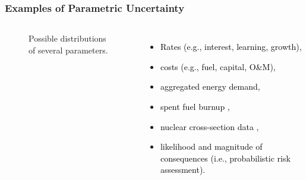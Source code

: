 \begin{frame}
    \frametitle{Examples of Parametric Uncertainty}

    \begin{columns}
        \column[t]{5cm}
        \begin{figure}
            \centering
            \resizebox{\columnwidth}{!}{
                
            }
            \caption{Possible distributions of several parameters.}
            \label{fig:multi-distributions}
        \end{figure}

        \column[t]{5cm}

        \begin{itemize}
            \item \textcolor{black}{Rates (e.g., interest, learning, growth),}
            \item \textcolor{black}{costs (e.g., fuel, capital, O\&M),}
            \item \textcolor{black}{aggregated energy demand,}
            \item \textcolor{black}{spent fuel burnup
            \cite{feng_sensitivity_2020},}
            \item \textcolor{black}{nuclear cross-section data
            \cite{eades_influence_2016,radaideh_combining_2019},}
            \item \textcolor{black}{likelihood and magnitude of consequences
            (i.e., probabilistic risk assessment).}
        \end{itemize}

    \end{columns}

\end{frame}





